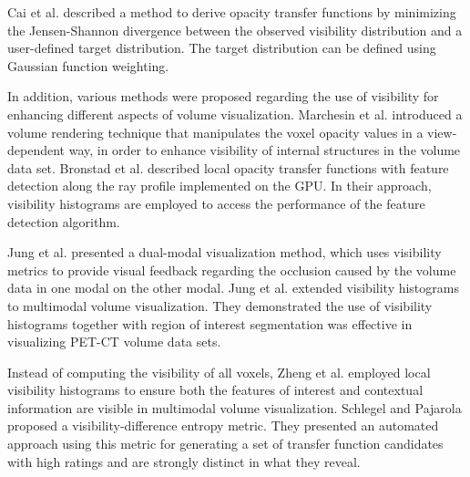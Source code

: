 \documentclass{egpubl}
\begin{document}
Cai et al. \cite{cai_automatic_2013} described a method to derive opacity transfer functions by minimizing the Jensen-Shannon divergence between the observed visibility distribution and a user-defined target distribution. The target distribution can be defined using Gaussian function weighting.





In addition, various methods were proposed regarding the use of visibility for enhancing different aspects of volume visualization.
Marchesin et al. \cite{marchesin_per-pixel_2010} introduced a volume rendering technique that manipulates the voxel opacity values in a view-dependent way, in order to enhance visibility of internal structures in the volume data set.
Bronstad et al. \cite{bronstad_visibility_2012} described local opacity transfer functions with feature detection along the ray profile implemented on the GPU. In their approach, visibility histograms are employed to access the performance of the feature detection algorithm.

Jung et al. \cite{jung_dual-modal_2012} presented a dual-modal visualization method, which uses visibility metrics to provide visual feedback regarding the occlusion caused by the volume data in one modal on the other modal.
Jung et al. \cite{jung_visibility-driven_2013} extended visibility histograms to multimodal volume visualization.
They demonstrated the use of visibility histograms together with region of interest segmentation was effective in visualizing PET-CT volume data sets.

Instead of computing the visibility of all voxels, Zheng et al. \cite{zheng_visibility_2013} employed local visibility histograms to ensure both the features of interest and contextual information are visible in multimodal volume visualization.
Schlegel and Pajarola \cite{schlegel_visibility-difference_2013} proposed a visibility-difference entropy metric. They presented an automated approach using this metric for generating a set of transfer function candidates with high ratings and are strongly distinct in what they reveal.
\end{document}
